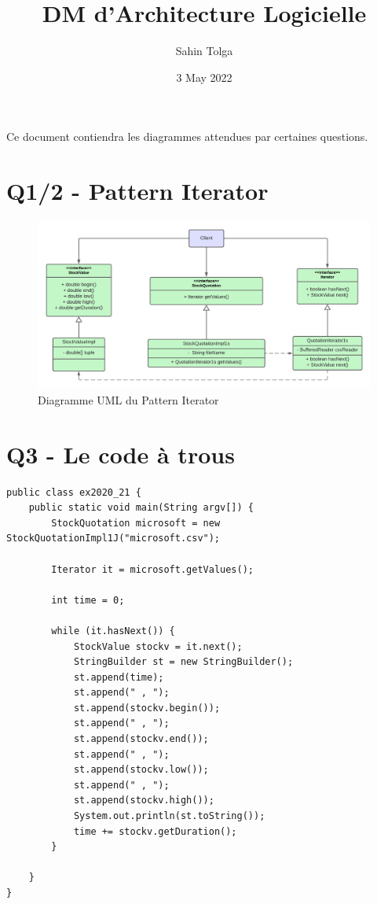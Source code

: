 \documentclass{article}
\title{DM d'Architecture Logicielle}
\author{Sahin Tolga}
\date{3 May 2022}
\begin{document}
\maketitle

Ce document contiendra les diagrammes attendues par certaines questions.

\section{Q1/2 - Pattern Iterator}


\begin{figure}[!htb]
    \centering
    \includegraphics[width=14cm]{umls/iterator.png}
    \caption{Diagramme UML du Pattern Iterator}
    \label{fig:it1}
\end{figure}

\section{Q3 - Le code à trous}
\begin{lstlisting}
public class ex2020_21 {
    public static void main(String argv[]) {
        StockQuotation microsoft = new StockQuotationImpl1J("microsoft.csv");
        
        Iterator it = microsoft.getValues();

        int time = 0;

        while (it.hasNext()) {
            StockValue stockv = it.next();
            StringBuilder st = new StringBuilder();
            st.append(time);
            st.append(" , ");
            st.append(stockv.begin());
            st.append(" , ");
            st.append(stockv.end());
            st.append(" , ");
            st.append(stockv.low());
            st.append(" , ");
            st.append(stockv.high());
            System.out.println(st.toString());
            time += stockv.getDuration();
        }
        
    }
}

\end{lstlisting}
\end{document}
